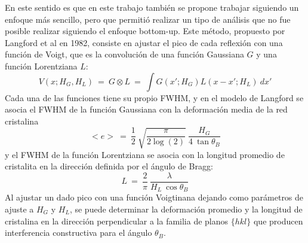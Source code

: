 En este sentido es que en este trabajo también se propone trabajar siguiendo un enfoque más sencillo, pero que permitió realizar un tipo de análisis que no fue posible realizar siguiendo el enfoque bottom-up.
Este método, propuesto por Langford et al en 1982\cite{DeKeijser1982}, consiste en ajustar el pico de cada reflexión con una función de Voigt, que es la convolución de una función Gaussiana $G$ y una función Lorentziana $L$:
\begin{equation}
  V(x; H_{G}, H_{L}) \ = \ G \otimes L \ = \ \int G(x'; H_{G}) L(x - x'; H_{L}) \ dx'
  \label{eq:Voigt}
\end{equation}
\noindent
Cada una de las funciones tiene su propio FWHM, y en el modelo de Langford se asocia el FWHM de la función Gaussiana con la deformación media de la red cristalina
\begin{equation}
  <e> \ = \ \frac{1}{2} \ \sqrt{\frac{\pi}{2\log(2)}} \ \frac{H_{G}}{4 \ \tan{\theta_B}}
  \label{eq:Gauss}
\end{equation}
\noindent
y el FWHM de la función Lorentziana se asocia con la longitud promedio de cristalita en la dirección definida por el ángulo de Bragg:
\begin{equation}
  L \ = \ \frac{2}{\pi} \ \frac{\lambda}{H_{L} \ \cos{\theta_B}}
  \label{eq:Lorentz}
\end{equation}
\noindent
Al ajustar un dado pico con una función Voigtinana dejando como parámetros de ajuste a $H_G$ y $H_L$, se puede determinar la deformación promedio y la longitud de  cristalina en la dirección perpendicular a la familia de planos $\{hkl\}$ que producen interferencia constructiva para el ángulo $\theta_B$.


